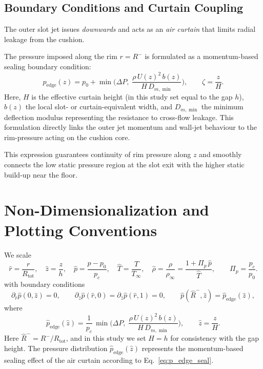 \documentclass[11pt,a4paper]{article}
\begin{document}
\subsection{Boundary Conditions and Curtain Coupling} \label{sec:boundaryconditions}
The outer slot jet issues \emph{downwards} and acts as an \emph{air curtain} that
limits radial leakage from the cushion. 

The pressure imposed along the rim $r=R^{-}$ is formulated as a momentum-based sealing boundary condition:
\begin{equation}
p_{\mathrm{edge}}(z)=p_0 + \min\!\Bigg(\Delta P,\;\frac{\rho\,U(z)^2\,b(z)}{H\,D_{m,\min}}\Bigg),
\qquad \zeta=\frac{z}{H}. \label{eq:p_edge_seal}
\end{equation}
Here, $H$ is the effective curtain height (in this study set equal to the gap $h$), $b(z)$ the local slot- or curtain-equivalent width, and $D_{m,\min}$ the minimum deflection modulus representing the resistance to cross-flow leakage. This formulation directly links the outer jet momentum and wall-jet behaviour to the rim-pressure acting on the cushion core.

This expression guarantees continuity of rim pressure along $z$ and smoothly connects
the low static pressure region at the slot exit with the higher static build-up near the
floor.

\section{Non-Dimensionalization and Plotting Conventions}
\label{sec:non-dimensionalization-and-plotting-conventions}

We scale
\begin{equation}
  \hat r=\frac{r}{R_{\mathrm{tot}}},\quad
  \hat z=\frac{z}{h},\quad
  \hat p=\frac{p-p_0}{p_c},\quad
  \hat T=\frac{T}{T_\infty},\quad
  \hat\rho=\frac{\rho}{\rho_\infty}
  =\frac{1+\Pi_p\,\hat p}{\hat T},\qquad
  \Pi_p=\frac{p_c}{p_0}.
\end{equation}
with boundary conditions
\begin{equation}
  \partial_{\hat r}\hat p(0,\hat z)=0, \qquad
  \partial_{\hat z}\hat p(\hat r,0)=\partial_{\hat z}\hat p(\hat r,1)=0, \qquad
  \hat p(\hat R^{-},\hat z)=\hat p_{\mathrm{edge}}(\hat z),
\end{equation}
where
\begin{equation}
  \hat p_{\mathrm{edge}}(\hat z)
  =\frac{1}{p_c}\,
   \min\!\Big(
      \Delta P,\;
      \frac{\rho\,U(z)^2\,b(z)}{H\,D_{m,\min}}
    \Big),
  \qquad
  \hat z=\frac{z}{H}.
\end{equation}
Here $\hat R^{-}=R^{-}/R_{\mathrm{tot}}$, and in this study we set $H=h$
for consistency with the gap height.  The pressure distribution
$\hat p_{\mathrm{edge}}(\hat z)$ represents the momentum-based
sealing effect of the air curtain according to
Eq.~\eqref{eq:p_edge_seal}.
\end{document}
